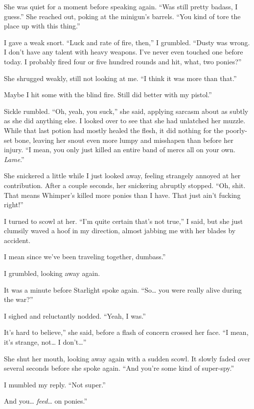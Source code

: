 She was quiet for a moment before speaking again. “Was still pretty badass, I guess.” She reached out, poking at the minigun’s barrels. “You kind of tore the place up with this thing.”

I gave a weak snort. “Luck and rate of fire, then,” I grumbled. “Dusty was wrong. I don’t have any talent with heavy weapons. I’ve never even touched one before today. I probably fired four or five hundred rounds and hit, what, two ponies?”

She shrugged weakly, still not looking at me. “I think it was more than that.”

\leavevmode{}Maybe I hit some with the blind fire. Still did better with my pistol.”

Sickle rumbled. “Oh, yeah, you suck,” she said, applying sarcasm about as subtly as she did anything else. I looked over to see that she had unlatched her muzzle. While that last potion had mostly healed the flesh, it did nothing for the poorly-set bone, leaving her snout even more lumpy and misshapen than before her injury. “I mean, you only just killed an entire band of mercs all on your own. \textit{Lame}.”

She snickered a little while I just looked away, feeling strangely annoyed at her contribution. After a couple seconds, her snickering abruptly stopped. “Oh, shit. That means Whimper’s killed more ponies than I have. That just ain’t fucking right!”

I turned to scowl at her. “I’m quite certain that’s not true,” I said, but she just clumsily waved a hoof in my direction, almost jabbing me with her blades by accident.

\leavevmode{}I mean since we’ve been traveling together, dumbass.”

I grumbled, looking away again.

It was a minute before Starlight spoke again. “So… you were really alive during the war?”

I sighed and reluctantly nodded. “Yeah, I was.”

\leavevmode{}It’s hard to believe,” she said, before a flash of concern crossed her face. “I mean, it’s strange, not… I don’t…”

She shut her mouth, looking away again with a sudden scowl. It slowly faded over several seconds before she spoke again. “And you’re some kind of super-spy.”

I mumbled my reply. “Not super.”

\leavevmode{}And you… \textit{feed}… on ponies.”

